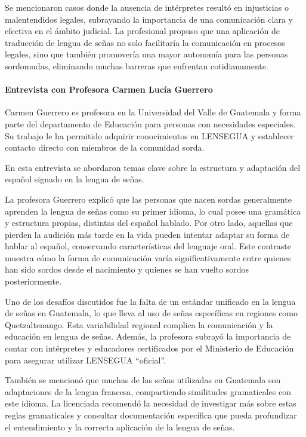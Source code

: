 Se mencionaron casos donde la ausencia de intérpretes resultó en injusticias o malentendidos legales, subrayando la importancia de una comunicación clara y efectiva en el ámbito judicial. La profesional propuso que una aplicación de traducción de lengua de señas no solo facilitaría la comunicación en procesos legales, sino que también promovería una mayor autonomía para las personas sordomudas, eliminando muchas barreras que enfrentan cotidianamente.

\paragraph{Entrevista con Profesora Carmen Lucía Guerrero}

Carmen Guerrero es profesora en la Universidad del Valle de Guatemala y forma parte del departamento de Educación para personas con necesidades especiales. Su trabajo le ha permitido adquirir conocimientos en LENSEGUA y establecer contacto directo con miembros de la comunidad sorda.

En esta entrevista se abordaron temas clave sobre la estructura y adaptación del español signado en la lengua de señas. 

La profesora Guerrero explicó que las personas que nacen sordas generalmente aprenden la lengua de señas como su primer idioma, lo cual posee una gramática y estructura propias, distintas del español hablado. Por otro lado, aquellas que pierden la audición más tarde en la vida pueden intentar adaptar su forma de hablar al español, conservando características del lenguaje oral. Este contraste muestra cómo la forma de comunicación varía significativamente entre quienes han sido sordos desde el nacimiento y quienes se han vuelto sordos posteriormente.

Uno de los desafíos discutidos fue la falta de un estándar unificado en la lengua de señas en Guatemala, lo que lleva al uso de señas específicas en regiones como Quetzaltenango. Esta variabilidad regional complica la comunicación y la educación en lengua de señas. Además, la profesora subrayó la importancia de contar con intérpretes y educadores certificados por el Ministerio de Educación para asegurar utilizar LENSEGUA “oficial”. 

También se mencionó que muchas de las señas utilizadas en Guatemala son adaptaciones de la lengua francesa, compartiendo similitudes gramaticales con este idioma. La licenciada recomendó la necesidad de investigar más sobre estas reglas gramaticales y consultar documentación específica que pueda profundizar el entendimiento y la correcta aplicación de la lengua de señas.


